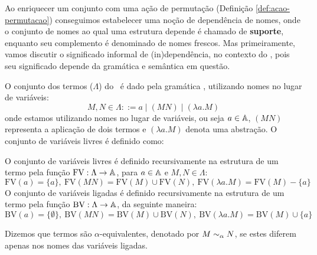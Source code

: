 Ao enriquecer um conjunto com uma ação de permutação (Definição \ref{def:acao-permutacao}) conseguimos estabelecer uma noção de dependência de nomes, onde o conjunto de nomes ao qual uma estrutura depende é chamado de \textbf{suporte}, enquanto seu complemento é denominado de nomes frescos.
Mas primeiramente, vamos discutir o significado informal de (in)dependência, no contexto do \lcalc, pois seu significado depende da gramática e semântica em questão.

O conjunto dos termos ($\Lambda$) do \lcalc~é dado pela gramática \cite{Hindley2008}, utilizando nomes no lugar de variáveis:
\begin{equation}\label{eq:lambda}
	M, N \in \Lambda ::= a \mid (M N) \mid (\lambda a . M)
\end{equation}
onde estamos utilizando nomes no lugar de variáveis, ou seja $a \in \mathbb{A}$, $(M N)$ representa a aplicação de dois termos e $(\lambda a . M)$ denota uma abstração. O conjunto de variáveis livres é definido como:
\begin{definicao}
	O conjunto de variáveis livres é definido recursivamente na estrutura de um termo pela função $\text{FV}: \Lambda \rightarrow \mathbb{A}$, para $a \in \mathbb{A}$ e $M, N \in \Lambda$:
	\begin{equation*}
		\text{FV}(a) = \{a\}, ~ \text{FV}(MN) = \text{FV}(M) \cup \text{FV}(N), ~
		\text{FV}(\lambda a . M) = \text{FV}(M) - \{a\}
	\end{equation*}
	O conjunto de variáveis ligadas é definido recursivamente na estrutura de um termo pela função $\text{BV}: \Lambda \rightarrow \mathbb{A}$, da seguinte maneira:
	\begin{equation*}
		\text{BV}(a) = \{\emptyset\}, ~ \text{BV}(MN) = \text{BV}(M) \cup \text{BV}(N), ~
		\text{BV}(\lambda a . M) = \text{BV}(M) \cup \{a\}
	\end{equation*}
\end{definicao}\noindent
Dizemos que termos são $\alpha$-equivalentes, denotado por $M \sim_{\alpha} N$, se estes diferem apenas nos nomes das variáveis ligadas.

